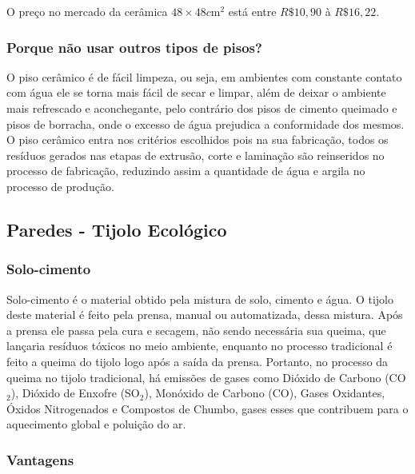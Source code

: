 	O preço no mercado da cerâmica $48\times48 c\si{\meter}^{2}$ está entre $R\$ 10,90$ à $R\$ 16,22$.

\subsubsection*{\textbf{Porque não usar outros tipos de pisos?}}

	O piso cerâmico é de fácil limpeza, ou seja, em ambientes com constante contato com água ele se torna mais fácil de secar e limpar, além de deixar o ambiente mais refrescado e aconchegante, pelo contrário dos pisos de cimento queimado e pisos de borracha, onde o excesso de água prejudica a conformidade dos mesmos. O piso cerâmico entra nos critérios escolhidos pois na sua fabricação, todos os resíduos gerados nas etapas de extrusão, corte e laminação são reinseridos no processo de fabricação, reduzindo assim a quantidade de água e argila no processo de produção.


\subsection{Paredes - Tijolo Ecológico }

\subsubsection*{\textbf{Solo-cimento}}
	
	Solo-cimento é o material obtido pela mistura de solo, cimento e água. O tijolo deste material é feito pela prensa, manual ou automatizada, dessa mistura. Após a prensa ele passa pela cura e secagem, não sendo necessária sua queima, que lançaria resíduos tóxicos no meio ambiente, enquanto no processo tradicional é feito a queima do tijolo logo após a saída da prensa. Portanto, no processo da queima no tijolo tradicional, há emissões de gases como Dióxido de Carbono (CO$_2$), Dióxido de Enxofre (SO$_2$), Monóxido de Carbono (CO), Gases Oxidantes, Óxidos Nitrogenados e Compostos de Chumbo, gases esses que contribuem para o aquecimento global e poluição do ar\cite{1980Portland}.\\

\subsubsection*{\textbf{Vantagens}}
	
